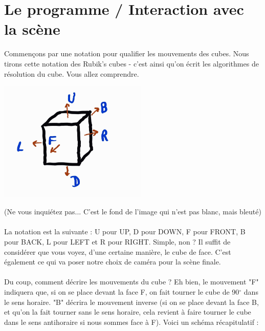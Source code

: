 \chapter[Le programme]{Le programme / Interaction avec la scène}
Commençons par une notation pour qualifier les mouvements des cubes. Nous tirons cette notation des Rubik's cubes - c'est ainsi qu'on écrit les algorithmes de résolution du cube. Vous allez comprendre.
\begin{center}
\includegraphics[width=200pt]{Rubik1.jpg}
\end{center}
(Ne vous inquiétez pas... C'est le fond de l'image qui n'est pas blanc, mais bleuté)
\\\\
La notation est la suivante : U pour UP, D pour DOWN, F pour FRONT, B pour BACK, L pour LEFT et R pour RIGHT. Simple, non ? Il suffit de considérer que vous voyez, d'une certaine manière, le cube de face. C'est également ce qui va poser notre choix de caméra pour la scène finale.
\\\\
Du coup, comment décrire les mouvements du cube ? Eh bien, le mouvement "F" indiquera que, si on se place devant la face F, on fait tourner le cube de 90$^{\circ}$ dans le sens horaire. "B" décrira le mouvement inverse (si on se place devant la face B, et qu'on la fait tourner sans le sens horaire, cela revient à faire tourner le cube dans le sens antihoraire si nous sommes face à F). Voici un schéma récapitulatif :
